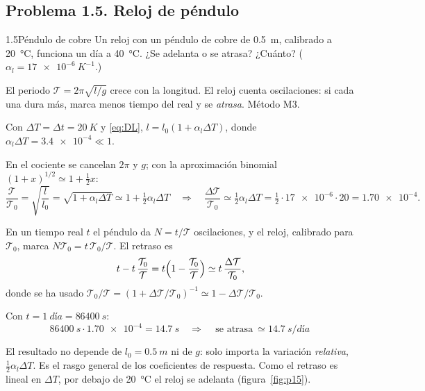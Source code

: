 \subsection{Problema 1.5. Reloj de péndulo}
\begin{problema}{1.5}{Péndulo de cobre}
Un reloj con un péndulo de cobre de \SI{0,5}{m}, calibrado a \SI{20}{\celsius}, funciona un día a
\SI{40}{\celsius}. ¿Se adelanta o se atrasa? ¿Cuánto? ($\alpha_l=\SI{17e-6}{K^{-1}}$.)
\end{problema}

\begin{resolucion}
\idea El periodo $\mathcal T=2\pi\sqrt{l/g}$ crece con la longitud. El reloj cuenta oscilaciones: si cada
una dura más, marca menos tiempo del real y se \emph{atrasa}. Método M3.

 Con $\Delta T=\Delta t=\SI{20}{K}$ y \eqref{eq:DL},
$l=l_0(1+\alpha_l\Delta T)$, donde $\alpha_l\Delta T=\num{3,4e-4}\ll1$.

 En el cociente se cancelan $2\pi$ y $g$; con la
aproximación binomial $(1+x)^{1/2}\simeq1+\tfrac12x$:
\[
  \frac{\mathcal T}{\mathcal T_0}=\sqrt{\frac{l}{l_0}}=\sqrt{1+\alpha_l\Delta T}\simeq1+\tfrac12\alpha_l\Delta T
  \quad\Longrightarrow\quad
  \frac{\Delta\mathcal T}{\mathcal T_0}\simeq\tfrac12\alpha_l\Delta T=\tfrac12\cdot\num{17e-6}\cdot20=\num{1,70e-4}.
\]

 En un tiempo real $t$ el péndulo da $N=t/\mathcal T$ oscilaciones, y el
reloj, calibrado para $\mathcal T_0$, marca $N\mathcal T_0=t\,\mathcal T_0/\mathcal T$. El retraso es
\[
  t-t\,\frac{\mathcal T_0}{\mathcal T}=t\Bigl(1-\frac{\mathcal T_0}{\mathcal T}\Bigr)\simeq t\,\frac{\Delta\mathcal T}{\mathcal T_0},
\]
donde se ha usado $\mathcal T_0/\mathcal T=(1+\Delta\mathcal T/\mathcal T_0)^{-1}\simeq1-\Delta\mathcal T/\mathcal T_0$.

 Con $t=\SI{1}{día}=\SI{86400}{s}$:
\[
  \SI{86400}{s}\cdot\num{1,70e-4}=\SI{14,7}{s}\quad\Longrightarrow\quad\boxed{\,\text{se atrasa}\ \simeq\SI{14,7}{s/día}\,}
\]
\end{resolucion}

\begin{observacion}
El resultado no depende de $l_0=\SI{0,5}{m}$ ni de $g$: solo importa la variación \emph{relativa},
$\tfrac12\alpha_l\Delta T$. Es el rasgo general de los coeficientes de respuesta. Como el retraso es
lineal en $\Delta T$, por debajo de \SI{20}{\celsius} el reloj se adelanta (figura~\ref{fig:p15}).
\end{observacion}

